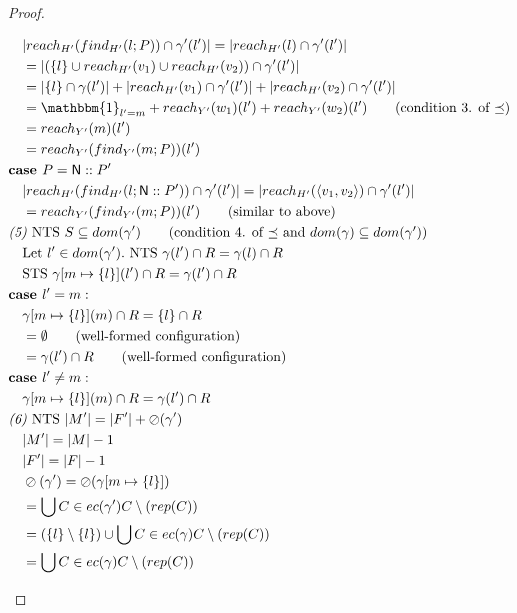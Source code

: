 \documentclass{easychair}
\newcommand{\ms}[1]{\ensuremath{\mathsf{#1}}}
\newcommand{\oh}[1]{\oslash(#1)}
\theoremstyle{definition}
\begin{document}
\begin{proof}
\begin{description}
\begin{align*}
		&\quad |reach_{H'}(find_{H'}(l;P)) \cap \gamma'(l')| = |reach_{H'}(l) \cap \gamma'(l')|\\
		&\quad = |(\{l\} \cup reach_{H'}(v_1) \cup reach_{H'}(v_2)) \cap \gamma'(l')|\\
		&\quad = |\{l\} \cap \gamma(l')| + |reach_{H'}(v_1) \cap \gamma'(l')| 
		+ |reach_{H'}(v_2) \cap \gamma'(l')| \\
		&\quad = \mathbbm{1}_{l' = m} + reach_{Y'}(w_1)(l') + reach_{Y'}(w_2)(l') 
			\tag{condition 3. of $\preceq$}\\
		&\quad = reach_{Y'}(m)(l')\\
		&\quad = reach_{Y'}(find_{Y'}(m;P))(l')\\
		&\textbf{case } P = \ms{N}::P'\\
		&\quad |reach_{H'}(find_{H'}(l;\ms{N}::P')) \cap \gamma'(l')| = 
			|reach_{H'}(\pairexcst{v_1}{v_2}) \cap \gamma'(l')|\\
		&\quad = reach_{Y'}(find_{Y'}(m;P))(l') \tag{similar to above}\\
		&\emph{(5) } \text{NTS } S \subseteq dom(\gamma') 
			\tag{condition 4. of $\preceq$ and $dom(\gamma) \subseteq dom(\gamma')$}\\
		&\quad\text{Let } l' \in dom(\gamma'). \text{ NTS } 
			\gamma(l') \cap R = \gamma(l) \cap R\\
		&\quad \text{STS } \gamma[m \mapsto \{l\}](l') \cap R = \gamma(l') \cap R\\
		&\textbf{case } l' = m:\\
		&\quad \gamma[m \mapsto \{l\}](m) \cap R = \{l\} \cap R\\
		&\quad = \emptyset \tag{well-formed configuration}\\
		&\quad = \gamma(l') \cap R \tag{well-formed configuration}\\
		&\textbf{case } l' \ne m:\\
		&\quad \gamma[m \mapsto \{l\}](m) \cap R = \gamma(l') \cap R\\
		&\emph{(6) } \text{NTS } |M'| = |F'| + \oh{\gamma'}\\
		&\quad |M'| = |M| - 1\\
		&\quad |F'| = |F| - 1\\
		&\quad \oh{\gamma'} = \oh{\gamma[m \mapsto \{l\}]}\\
		&\quad = \bigcup C \in ec(\gamma') C \setminus (rep(C))\\
		&\quad = (\{l\} \setminus \{l\}) \cup \bigcup C \in ec(\gamma) C \setminus (rep(C))\\
		&\quad = \bigcup C \in ec(\gamma) C \setminus (rep(C))\\

\end{align*}
\end{description}
\end{proof}
\end{document}
